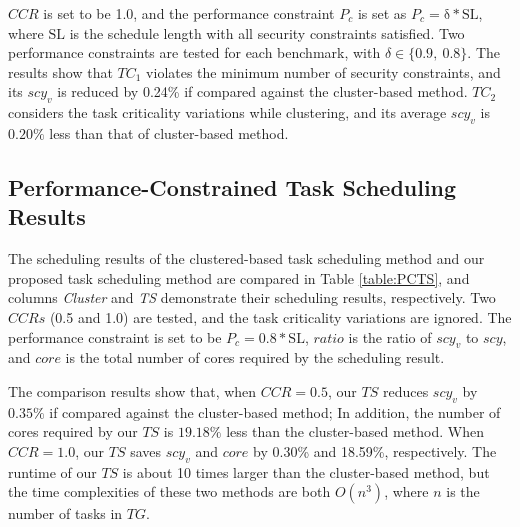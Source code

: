 \documentclass[conference]{IEEEtran}
\begin{document}
$CCR$ is set to be 1.0, and the performance constraint $P_c$ is set as $P_c=\mathrm{\delta*SL}$, where $\mathrm{SL}$ is the schedule length with all security constraints satisfied. Two performance constraints are tested for each benchmark, with $\delta \in \{0.9, ~0.8\}$. The results show that $TC_1$ violates the minimum number of security constraints, and its $scy_v$ is reduced by 0.24\% if compared against the cluster-based method. $TC_2$ considers the task criticality variations while clustering, and its average $scy_v$ is $0.20\%$ less than that of cluster-based method.




\subsection{Performance-Constrained Task Scheduling Results}
The scheduling results of the clustered-based task scheduling method \cite{article:CL} and our proposed task scheduling method are compared in Table \ref{table:PCTS}, and columns \textit{Cluster} and \textit{TS} demonstrate their scheduling results, respectively. Two $CCRs$ (0.5 and 1.0) are tested, and the task criticality variations are ignored. The performance constraint is set to be $P_c=\mathrm{0.8*SL}$, $ratio$ is the ratio of $scy_v$ to $scy$, and $core$ is the total number of cores required by the scheduling result.

The comparison results show that, when $CCR=0.5$, our $TS$ reduces $scy_v$ by $0.35\%$ if compared against the cluster-based method; In addition, the number of cores required by our $TS$ is $19.18\%$ less than the cluster-based method. When $CCR=1.0$, our $TS$ saves $scy_v$ and $core$ by 0.30\% and 18.59\%, respectively. The runtime of our $TS$ is about 10 times larger than the cluster-based method, but the time complexities of these two methods are both $O(n^3)$, where $n$ is the number of tasks in $TG$.



\end{document}
